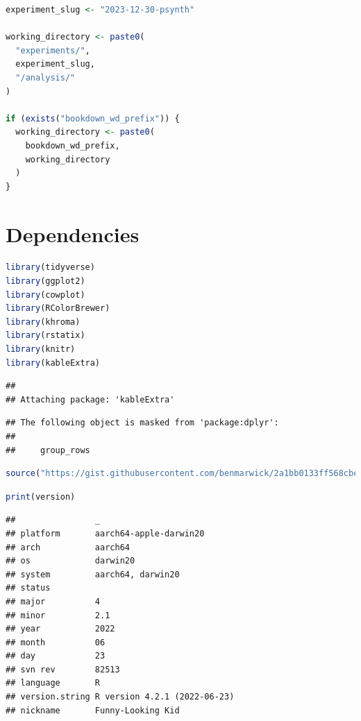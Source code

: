 \documentclass[
]{book}
\begin{document}
\begin{lstlisting}[language=R]
experiment_slug <- "2023-12-30-psynth"

working_directory <- paste0(
  "experiments/",
  experiment_slug,
  "/analysis/"
)

if (exists("bookdown_wd_prefix")) {
  working_directory <- paste0(
    bookdown_wd_prefix,
    working_directory
  )
}
\end{lstlisting}

\hypertarget{dependencies-3}{%
\section{Dependencies}\label{dependencies-3}}

\begin{lstlisting}[language=R]
library(tidyverse)
library(ggplot2)
library(cowplot)
library(RColorBrewer)
library(khroma)
library(rstatix)
library(knitr)
library(kableExtra)
\end{lstlisting}

\begin{lstlisting}
## 
## Attaching package: 'kableExtra'
\end{lstlisting}

\begin{lstlisting}
## The following object is masked from 'package:dplyr':
## 
##     group_rows
\end{lstlisting}

\begin{lstlisting}[language=R]
source("https://gist.githubusercontent.com/benmarwick/2a1bb0133ff568cbe28d/raw/fb53bd97121f7f9ce947837ef1a4c65a73bffb3f/geom_flat_violin.R")
\end{lstlisting}

\begin{lstlisting}[language=R]
print(version)
\end{lstlisting}

\begin{lstlisting}
##                _                           
## platform       aarch64-apple-darwin20      
## arch           aarch64                     
## os             darwin20                    
## system         aarch64, darwin20           
## status                                     
## major          4                           
## minor          2.1                         
## year           2022                        
## month          06                          
## day            23                          
## svn rev        82513                       
## language       R                           
## version.string R version 4.2.1 (2022-06-23)
## nickname       Funny-Looking Kid
\end{lstlisting}
\end{document}

